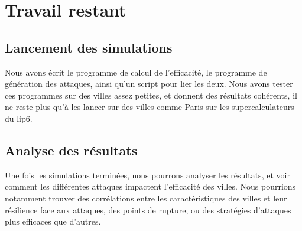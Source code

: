 \section{Travail restant}
\subsection{Lancement des simulations}
Nous avons écrit le programme de calcul de l'efficacité, le programme de génération des attaques, ainsi qu'un script pour lier les deux.
Nous avons tester ces programmes sur des villes assez petites, et donnent des résultats cohérents, il ne reste plus qu'à les lancer sur des villes comme Paris sur les supercalculateurs du lip6.
\subsection{Analyse des résultats}
Une fois les simulations terminées, nous pourrons analyser les résultats, et voir comment les différentes attaques impactent l'efficacité des villes.
Nous pourrions notamment trouver des corrélations entre les caractéristiques des villes et leur résilience face aux attaques, des points de rupture, ou des stratégies d'attaques plus efficaces que d'autres.
